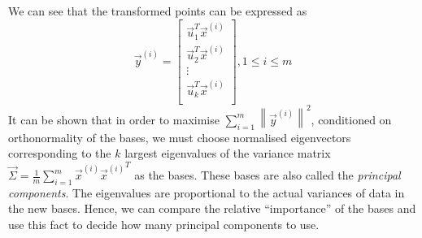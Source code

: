 We can see that the transformed points can be expressed as
\begin{equation}
 	\vec y^{(i)} =
 		\begin{bmatrix}
 			\vec u_1^T \vec x^{(i)} \\
 			\vec u_2^T \vec x^{(i)} \\
 			\vdots \\
 			\vec u_k^T \vec x^{(i)} \\
 		\end{bmatrix}
 		, 1 \leq i \leq m
	\label{eqn:pca}
\end{equation}
It can be shown that in order to maximise $\sum_{i = 1}^m \left\| \vec y^{(i)} \right\|^2$, conditioned on orthonormality of the bases, we must choose normalised eigenvectors corresponding to the $k$ largest eigenvalues of the variance matrix $\vec \Sigma = \frac{1}{m} \sum_{i = 1}^m \vec x^{(i)} {\vec x^{(i)}}^T$ as the bases. These bases are also called the \emph{principal components}. The eigenvalues are proportional to the actual variances of data in the new bases. Hence, we can compare the relative ``importance'' of the bases and use this fact to decide how many principal components to use.